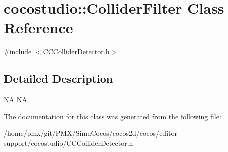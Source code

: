 \hypertarget{classcocostudio_1_1ColliderFilter}{}\section{cocostudio\+:\+:Collider\+Filter Class Reference}
\label{classcocostudio_1_1ColliderFilter}


{\ttfamily \#include $<$C\+C\+Collider\+Detector.\+h$>$}



\subsection{Detailed Description}
NA  NA 

The documentation for this class was generated from the following file\+:\begin{DoxyCompactItemize}
\item 
/home/pmx/git/\+P\+M\+X/\+Simu\+Cocos/cocos2d/cocos/editor-\/support/cocostudio/C\+C\+Collider\+Detector.\+h\end{DoxyCompactItemize}
